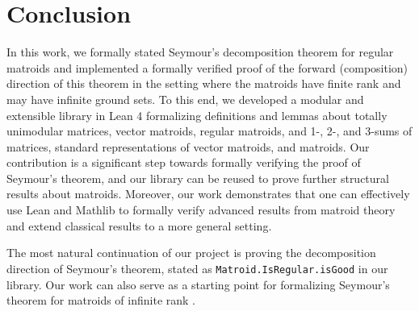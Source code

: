 \section{Conclusion}

In this work, we formally stated Seymour's decomposition theorem for regular matroids and implemented a formally verified proof of the forward (composition) direction of this theorem in the setting where the matroids have finite rank and may have infinite ground sets. To this end, we developed a modular and extensible library in Lean 4 formalizing definitions and lemmas about totally unimodular matrices, vector matroids, regular matroids, and 1-, 2-, and 3-sums of matrices, standard representations of vector matroids, and matroids. Our contribution is a significant step towards formally verifying the proof of Seymour's theorem, and our library can be reused to prove further structural results about matroids. Moreover, our work demonstrates that one can effectively use Lean and Mathlib to formally verify advanced results from matroid theory and extend classical results to a more general setting.

The most natural continuation of our project is proving the decomposition direction of Seymour's theorem, stated as \texttt{Matroid.IsRegular.isGood} in our library. Our work can also serve as a starting point for formalizing Seymour's theorem for matroids of infinite rank \cite{Bowler2013}.


